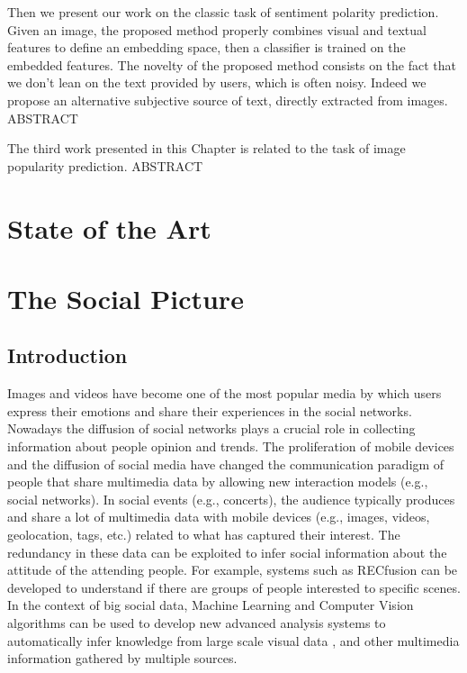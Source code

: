 Then we present our work on the classic task of sentiment polarity prediction. Given an image, the proposed method properly combines visual and textual features to define an embedding space, then a classifier is trained on the embedded features. The novelty of the proposed method consists on the fact that we don't lean on the text provided by users, which is often noisy. Indeed we propose an alternative subjective source of text, directly extracted from images.
ABSTRACT

The third work presented in this Chapter is related to the task of image popularity prediction.
ABSTRACT
\section{State of the Art}


\section{The Social Picture}\label{TSP}
\subsection{Introduction}
Images and videos have become one of the most popular media by which users express their emotions and share their experiences in the social networks. Nowadays the diffusion of social networks plays a crucial role in collecting information about people opinion and trends.
The proliferation of mobile devices and the diffusion of social media have changed the communication paradigm of people that share multimedia data by allowing new interaction models (e.g., social networks). In social events (e.g., concerts), the audience typically produces and share a lot of multimedia data with mobile devices (e.g., images, videos, geolocation, tags, etc.) related to what has captured their interest. The redundancy in these data can be exploited to infer social information about the attitude of the attending people. For example, systems such as RECfusion \cite{Ortis2015n525} can be developed to understand if there are groups of people interested to specific scenes. In the context of big social data, Machine Learning and Computer Vision algorithms can be used to develop new advanced analysis systems to automatically infer knowledge from large scale visual data \cite{weyand2015visual}, and other multimedia information gathered by multiple sources.

